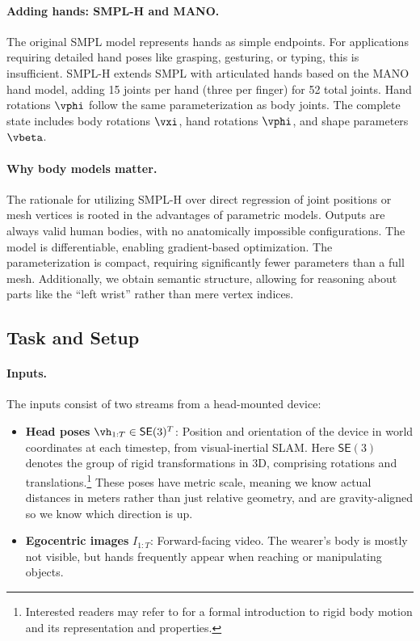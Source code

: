 \documentclass[../../book-main.tex]{subfiles}
\begin{document}
\paragraph{Adding hands: SMPL-H and MANO.}
The original SMPL model represents hands as simple endpoints. For
applications requiring detailed hand poses like grasping, gesturing,
or typing, this is insufficient. SMPL-H \citep{romero2017embodied}
extends SMPL with articulated hands based on the MANO hand model,
adding 15 joints per hand (three per finger) for 52 total joints.
Hand rotations \(\vphi\) follow the same parameterization as body
joints. The complete state includes body rotations \(\vxi\), hand
rotations \(\vphi\), and shape parameters \(\vbeta\).

\paragraph{Why body models matter.}
The rationale for utilizing SMPL-H over direct regression of joint positions
or mesh vertices is rooted in the advantages of parametric models. Outputs are
always valid human bodies, with no anatomically impossible
configurations. The model is differentiable, enabling gradient-based
optimization. The parameterization is compact, requiring significantly fewer
parameters than a full mesh. Additionally, we obtain semantic structure,
allowing for reasoning about parts like the ``left wrist'' rather than mere
vertex indices.

\subsection{Task and Setup}
\label{sub:egoallo_objective}

\paragraph{Inputs.}
The inputs consist of two streams from a head-mounted device:
\begin{itemize}
    \item \textbf{Head poses} \(\vh_{1:T} \in \mathsf{SE}(3)^{T}\):
        Position and orientation of the device in world coordinates
        at each timestep, from visual-inertial SLAM. Here \(\mathsf{SE}(3)\)
        denotes the group of rigid transformations in 3D, comprising
        rotations and translations.\footnote{Interested readers may
            refer to \citep{MaY2003} for a formal introduction to rigid
        body motion and its representation and properties.} These
        poses have metric scale, meaning we know actual distances in
        meters rather than just relative geometry, and are
        gravity-aligned so we know which direction is up.
    \item \textbf{Egocentric images} \(I_{1:T}\): Forward-facing video.
        The wearer's body is mostly not visible, but hands frequently
        appear when reaching or manipulating objects.
\end{itemize}
\end{document}
